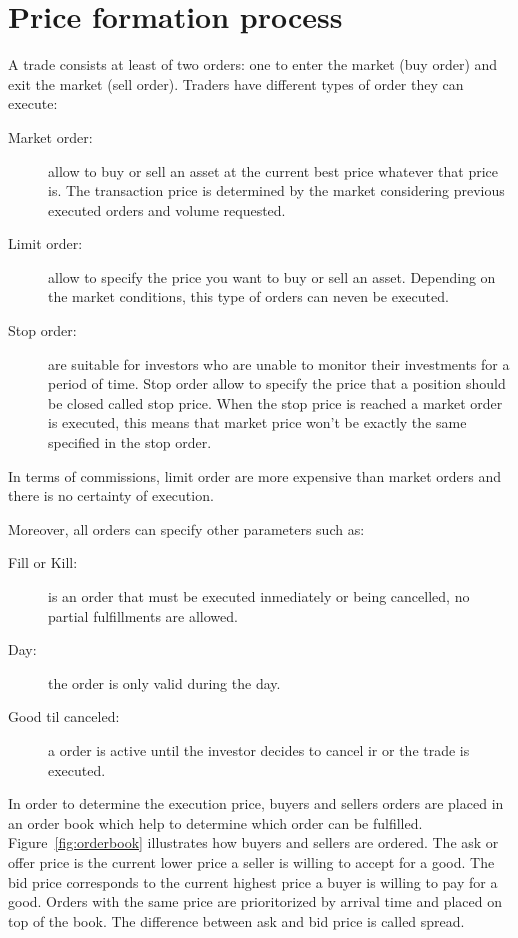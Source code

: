 \section{Price formation process}

A trade consists at least of two orders: one to enter the market (buy order) and
exit the market (sell order). Traders have different types of order they can
execute:

\begin{description}
\item[Market order:] allow to buy or sell an asset at the current best price
whatever that price is. The transaction price is determined by the market
considering previous executed orders and volume requested.
\item[Limit order:] allow to specify the price you want to buy or sell an asset.
Depending on the market conditions, this type of orders can neven be executed.
\item[Stop order:] are suitable for investors who are unable to monitor their
investments for a period of time. Stop order allow to specify the price that a
position should be closed called stop price. When the stop price is reached a
market order is executed, this means that market price won't be exactly the same
specified in the stop order.
\end{description}

In terms of commissions, limit order are more expensive than market orders and
there is no certainty of execution.

Moreover, all orders can specify other parameters such as: 

\begin{description}
\item[Fill or Kill:] is an order that must be executed inmediately or being
cancelled, no partial fulfillments are allowed. 
\item[Day:] the order is only valid during the day.
\item[Good til canceled:] a order is active until the investor decides to cancel
ir or the trade is executed.
\end{description}

In order to determine the execution price, buyers and sellers orders are placed
in an order book which help to determine which order can be fulfilled.
Figure~\ref{fig:orderbook} illustrates how buyers and sellers are ordered. The
ask or offer price is the current lower price a seller is willing to accept for
a good. The bid price corresponds to the current highest price a buyer is
willing to pay for a good. Orders with the same price are prioritorized by
arrival time and placed on top of the book.  The difference between ask and bid
price is called spread.


